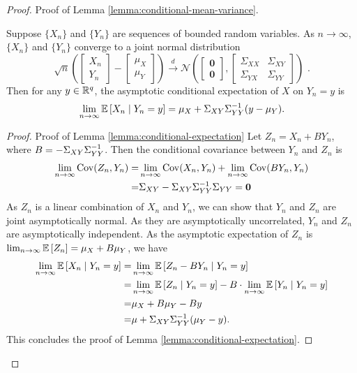 \begin{proof}{Proof of Lemma \ref{lemma:conditional-mean-variance}.}
\begin{lemma}\label{lemma:conditional-expectation}
    Suppose $\{X_n\}$ and $\{Y_n\}$ are sequences of bounded random variables.  As $n \rightarrow \infty$, $\{X_n\}$ and $\{Y_n\}$ converge to a joint normal distribution 
    \[\sqrt{n}\left( \begin{bmatrix}
        X_n \\ Y_n
    \end{bmatrix} - \begin{bmatrix}
       \mu_X \\ \mu_Y
    \end{bmatrix}\right) \xrightarrow{d} \mathcal{N} \left(\begin{bmatrix}
        \bm{0} \\ \bm{0}
    \end{bmatrix}, \begin{bmatrix}
        \Sigma_{XX} & \Sigma_{XY} \\ \Sigma_{YX} & \Sigma_{YY}
    \end{bmatrix} \right) \,\, . \]
    Then for any $y \in \mathbb{R}^q$, the asymptotic conditional expectation of  $X$ on $Y_n = y$ is
    \[ \lim_{n \rightarrow \infty} \mathbb{E}\left[X_n \mid Y_n = y \right]= \mu_X + \Sigma_{XY} \Sigma_{YY}^{-1} (y - \mu_Y). \]
\end{lemma}

\begin{proof}{Proof of Lemma \ref{lemma:conditional-expectation}}
    Let $Z_n =X_n  + B Y_n $, where $B = - \Sigma_{XY} \Sigma_{YY}^{-1}$. Then the conditional covariance between $Y_n$ and $Z_n$ is 
    \begin{align*}
        \lim_{n \rightarrow \infty}\mathrm{Cov}(Z_n, Y_n) =& \lim_{n \rightarrow \infty} \mathrm{Cov}(X_n, Y_n) +  \lim_{n \rightarrow \infty}  \mathrm{Cov}(B Y_n, Y_n) \\
        =& \Sigma_{XY}  - \Sigma_{XY} \Sigma_{YY}^{-1} \Sigma_{YY} = \bm{0} 
    \end{align*}
    As $Z_n$ is a linear combination of $X_n$ and $Y_n$, we can show that $Y_n$ and $Z_n$ are joint asymptotically normal. As they are asymptotically uncorrelated, $Y_n$ and $Z_n$ are asymptotically independent. As the asymptotic expectation of $Z_n$ is $ \lim_{n \rightarrow \infty}\mathbb{E}\left[Z_n  \right] = \mu_X + B \mu_Y$, we have 
    \begin{align*}
        \lim_{n \rightarrow \infty}\mathbb{E}\left[X_n \mid Y_n = y \right] =& \lim_{n \rightarrow \infty}\mathbb{E}\left[Z_n - B Y_n \mid Y_n = y \right] \\
        =& \lim_{n \rightarrow \infty}\mathbb{E}\left[Z_n \mid Y_n = y \right] - B \cdot \lim_{n \rightarrow \infty}\mathbb{E}\left[ Y_n \mid Y_n = y \right] \\
        =& \mu_X + B \mu_Y - B y \\
        =& \mu + \Sigma_{XY} \Sigma_{YY}^{-1} (\mu_Y - y).
    \end{align*}
    This concludes the proof of Lemma \ref{lemma:conditional-expectation}. \halmos
\end{proof}




\end{proof}
